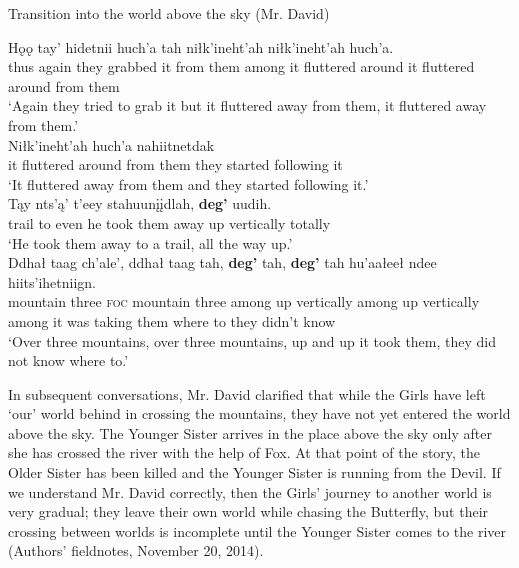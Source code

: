 \begin{exe}
\ex Transition into the world above the sky (Mr. David)\label{brucks:davidr-transition-to}
\begin{xlist}

\ex \gll Hǫǫ tay' hidetnii huch'a tah niłk'ineht'ah niłk'ineht'ah huch'a.  \\
 thus again {they grabbed it} {from them} among {it fluttered around} {it fluttered around} {from them} \\
\glt `Again they tried to grab it but it fluttered away from them, it fluttered away from them.' \\

\ex \gll Niłk'ineht'ah huch'a nahiitnetdak  \\
 {it fluttered around} {from them} {they started following it}\\
\glt `It fluttered away from them and they started following it.' \\

\gll Tąy nts'ą' t'eey stahuunįįdlah, \textbf{deg'} uudih. \\
 trail to even {he took them away} {up vertically} {totally} \\
\glt `He took them away to a trail, all the way up.' \\

\ex \gll Ddhał taag ch'ale',  ddhał taag tah, \textbf{deg'} tah, \textbf{deg'} tah hu'aałeeł ndee hiits'ihetniign.  \\
 mountain three \textsc{foc} mountain three among {up vertically} among {up vertically} among {it was taking them} {where to} {they didn't know}  \\
\glt `Over three mountains, over three mountains, up and up it took them, they did not know where to.'\\
\end{xlist}
\end{exe}

In subsequent conversations, Mr. David clarified that while the Girls have left `our' world behind in crossing the mountains, they have not yet entered the world above the sky. The Younger Sister arrives in the place above the sky only after she has crossed the river with the help of Fox. At that point of the story, the Older Sister has been killed and the Younger Sister is running from the Devil. If we understand Mr. David correctly, then the Girls' journey to another world is very gradual; they leave their own world while chasing the Butterfly, but their crossing between worlds is incomplete until the Younger Sister comes to the river (Authors' fieldnotes, November 20, 2014).

